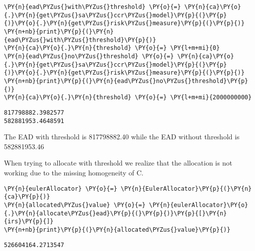     \begin{tcolorbox}[breakable, size=fbox, boxrule=1pt, pad at break*=1mm,colback=cellbackground, colframe=cellborder]
\begin{Verbatim}[commandchars=\\\{\}]
\PY{n}{ead\PYZus{}with\PYZus{}threshold} \PY{o}{=} \PY{n}{ca}\PY{o}{.}\PY{n}{get\PYZus{}sa\PYZus{}ccr\PYZus{}model}\PY{p}{(}\PY{p}{)}\PY{o}{.}\PY{n}{get\PYZus{}risk\PYZus{}measure}\PY{p}{(}\PY{p}{)}
\PY{n+nb}{print}\PY{p}{(}\PY{n}{ead\PYZus{}with\PYZus{}threshold}\PY{p}{)}
\PY{n}{ca}\PY{o}{.}\PY{n}{threshold} \PY{o}{=} \PY{l+m+mi}{0}
\PY{n}{ead\PYZus{}no\PYZus{}threshold} \PY{o}{=} \PY{n}{ca}\PY{o}{.}\PY{n}{get\PYZus{}sa\PYZus{}ccr\PYZus{}model}\PY{p}{(}\PY{p}{)}\PY{o}{.}\PY{n}{get\PYZus{}risk\PYZus{}measure}\PY{p}{(}\PY{p}{)}
\PY{n+nb}{print}\PY{p}{(}\PY{n}{ead\PYZus{}no\PYZus{}threshold}\PY{p}{)}
\PY{n}{ca}\PY{o}{.}\PY{n}{threshold} \PY{o}{=} \PY{l+m+mi}{2000000000}
\end{Verbatim}
\end{tcolorbox}

    \begin{Verbatim}[commandchars=\\\{\}]
817798882.3982577
582881953.4648591
    \end{Verbatim}

    The EAD with threshold is 817798882.40 while the EAD without threshold
is 582881953.46

    
    When trying to allocate with threshold we realize that the allocation is
not working due to the missing homogeneity of C.

    \begin{tcolorbox}[breakable, size=fbox, boxrule=1pt, pad at break*=1mm,colback=cellbackground, colframe=cellborder]
\begin{Verbatim}[commandchars=\\\{\}]
\PY{n}{eulerAllocator} \PY{o}{=} \PY{n}{EulerAllocator}\PY{p}{(}\PY{n}{ca}\PY{p}{)}
\PY{n}{allocated\PYZus{}value} \PY{o}{=} \PY{n}{eulerAllocator}\PY{o}{.}\PY{n}{allocate\PYZus{}ead}\PY{p}{(}\PY{p}{)}\PY{p}{[}\PY{n}{irs}\PY{p}{]}
\PY{n+nb}{print}\PY{p}{(}\PY{n}{allocated\PYZus{}value}\PY{p}{)}
\end{Verbatim}
\end{tcolorbox}

    \begin{Verbatim}[commandchars=\\\{\}]
526604164.2713547
    \end{Verbatim}

